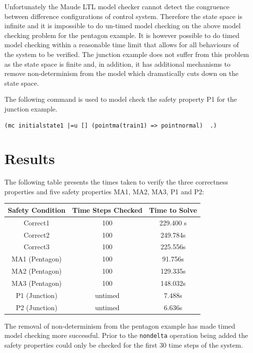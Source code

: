 Unfortunately the Maude LTL model checker cannot detect the congruence between difference configurations of control system. Therefore the state space is infinite and it is impossible to do un-timed model checking on the above model checking problem for the pentagon example. It is however possible to do timed model checking within a reasonable time limit that allows for all behaviours of the system to be verified. The junction example does not suffer from this problem as the state space is finite and, in addition, it has additional mechanisms to remove non-determinism from the model which dramatically cuts down on the state space.

The following command is used to model check the safety property P1 for the junction example.

\begin{lstlisting}[caption = The model checking command the point does not move property]
(mc initialstate1 |=u [] (pointma(train1) => pointnormal)  .)
\end{lstlisting}

\section{Results}
The following table presents the times taken to verify the three correctness properties and five safety properties MA1, MA2, MA3, P1 and P2:
\medskip
\begin{center}
\begin{tabular}{c | c | c} 
Safety Condition & Time Steps Checked & Time to Solve  \\ \hline
Correct1 & 100 & 229.400 s\\
Correct2 & 100 & 249.784s\\
Correct3 & 100 & 225.556s\\
MA1 (Pentagon)& 100 & 91.756s  \\
MA2 (Pentagon)& 100 &129.335s \\ 
MA3 (Pentagon)& 100 &148.032s \\
P1 (Junction)& untimed &7.488s \\
P2 (Junction)& untimed & 6.636s \\
\end{tabular}
\end{center}
\medskip
The removal of non-determinism from the pentagon example has made timed model checking more successful. Prior to the \texttt{nondelta} operation being added the safety properties could only be checked for the first 30 time steps of the system.

